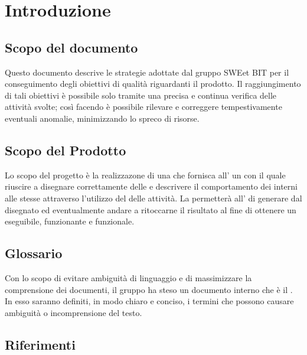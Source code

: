\section{Introduzione}
  \subsection{Scopo del documento}
          Questo documento descrive le strategie adottate dal gruppo SWEet BIT per il conseguimento degli obiettivi di qualità riguardanti il prodotto.
          Il raggiungimento di tali obiettivi è possibile solo tramite una precisa e continua verifica delle attività svolte; così facendo è possibile
          rilevare e correggere tempestivamente eventuali anomalie, minimizzando lo spreco di risorse.
  \subsection{Scopo del Prodotto}
          Lo scopo del progetto è la realizzazone di una  che fornisca all' un   con il quale riuscire a disegnare correttamente  delle 
          e descrivere il comportamento dei  interni alle stesse attraverso l'utilizzo del  delle attività.
          La  permetterà all' di generare   dal  disegnato ed eventualmente andare a ritoccarne il risultato al fine di ottenere un 
          eseguibile, funzionante e funzionale.
  \subsection{Glossario}
          Con lo scopo di evitare ambiguità di linguaggio e di massimizzare la comprensione dei documenti, il
          gruppo ha steso un documento interno che è il . In esso saranno definiti, in modo
          chiaro e conciso, i termini che possono causare ambiguità o incomprensione del testo.
  \subsection{Riferimenti}
